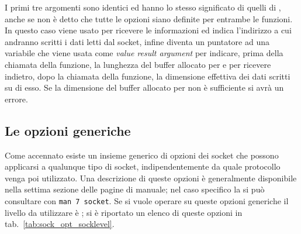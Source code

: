 I primi tre argomenti sono identici ed hanno lo stesso significato di quelli
di , anche se non è detto che tutte le opzioni siano definite
per entrambe le funzioni. In questo caso  viene usato per
ricevere le informazioni ed indica l'indirizzo a cui andranno scritti i dati
letti dal socket, infine  diventa un puntatore ad una variabile
che viene usata come \textit{value result argument} per indicare, prima della
chiamata della funzione, la lunghezza del buffer allocato per  e
per ricevere indietro, dopo la chiamata della funzione, la dimensione
effettiva dei dati scritti su di esso.  Se la dimensione del buffer allocato
per  non è sufficiente si avrà un errore.



\subsection{Le opzioni generiche}
\label{sec:sock_generic_options}

Come accennato esiste un insieme generico di opzioni dei socket che possono
applicarsi a qualunque tipo di socket, indipendentemente da quale protocollo
venga poi utilizzato. Una descrizione di queste opzioni è generalmente
disponibile nella settima sezione delle pagine di manuale; nel caso specifico
la si può consultare con \texttt{man 7 socket}. Se si vuole operare su queste
opzioni generiche il livello da utilizzare è ; si è
riportato un elenco di queste opzioni in tab.~\ref{tab:sock_opt_socklevel}.


